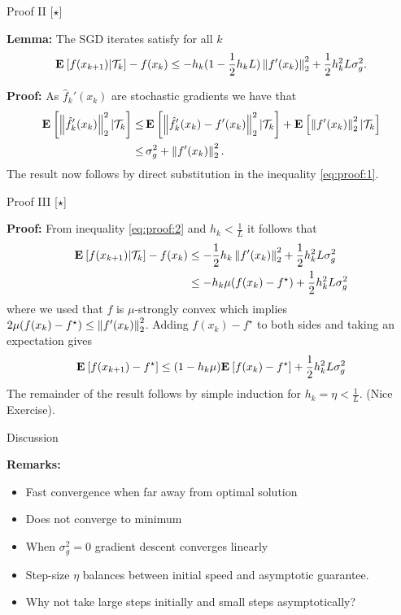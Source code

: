 \documentclass[9pt]{beamer}
\begin{document}
\begin{frame}{Proof II [$\star$]}

  \textbf{Lemma:} The SGD iterates satisfy for all $k$
  \begin{equation}
    \label{eq:proof:2}
    \mathbf{E}_{} \left[ f(x_{k+1})|\mathcal T_k \right]-f(x_k) \leq -h_k(1-\frac 12 h_k L) \left\|f'(x_k)\right\|^2_2+ \frac 12 h_k^2 L \sigma_g^2.
  \end{equation}
  
  \textbf{Proof:} As $\hat f_k'(x_k)$ are stochastic gradients we have that
  \begin{align*}
    \mathbf{E}_{} \left[ \left\|\hat f_k'(x_k)\right\|^2_2|\mathcal T_k \right] \leq & \,\mathbf{E}_{} \left[ \left\|\hat f_k'(x_k)-f'(x_k)\right\|^2_2|\mathcal T_k \right] + \mathbf{E}_{} \left[ \left\|f'(x_k)\right\|^2_2|\mathcal T_k \right]\\
    \leq & \, \sigma_g^2 + \left\|f'(x_k)\right\|^2_2.
  \end{align*}
  The result now follows by direct substitution in the inequality \eqref{eq:proof:1}. 
  
\end{frame}

\begin{frame}{Proof III [$\star$]}
  
  \textbf{Proof:} From inequality \eqref{eq:proof:2} and $h_k<\frac 1L$ it follows that
  \begin{align*}
    \mathbf{E}_{} \left[ f(x_{k+1})|\mathcal T_k \right]-f(x_k) & \leq -\frac 12 h_k \left\|f'(x_k)\right\|^2_2+ \frac 12 h_k^2 L \sigma_g^2\\
                                    & \leq  - h_k \mu (f(x_k)-f^\star)+ \frac 12 h_k^2 L \sigma_g^2
  \end{align*}
  where we used that $f$ is $\mu$-strongly convex which implies $2\mu(f(x_k)-f^\star)\leq \left\|f'(x_k)\right\|^2_2$.
  Adding $f(x_k)-f^\star$ to both sides and taking an expectation gives
  \begin{align}
    \label{eq:proof:3}
    \mathbf{E}_{} \left[ f(x_{k+1})-f^\star \right] \leq (1- h_k\mu)\mathbf{E}_{} \left[ f(x_k)-f^\star \right]+ \frac 12 h_k^2 L \sigma_g^2
  \end{align}
  The remainder of the result follows by simple induction for $h_k=\eta<\frac 1L$. (Nice Exercise).
\end{frame}


\begin{frame}{Discussion}

  \textbf{Remarks:}
  \begin{itemize}
    \setlength\itemsep{1em}
  \item Fast convergence when far away from optimal solution
  \item Does not converge to minimum
  \item When $\sigma^2_g=0$ gradient descent converges linearly
  \item Step-size $\eta$ balances between initial speed and asymptotic guarantee.
  \item<2-> Why not take large steps initially and small steps asymptotically?
  \end{itemize}
  
\end{frame}
\end{document}
